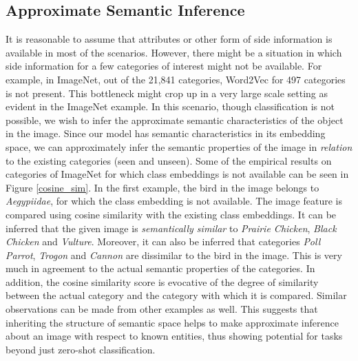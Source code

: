 \documentclass[10pt,twocolumn,letterpaper]{article}
\begin{document}
\subsection{Approximate Semantic Inference}
\label{approx_semantic_inference} 
It is reasonable to assume that attributes or other form of side information is available in most of the scenarios. However, there might be a situation in which side information for a few categories of interest might not be available. For example, in ImageNet, out of the 21,841 categories, Word2Vec for 497 categories is not present. This bottleneck might crop up in a very large scale setting as evident in the ImageNet example. In this scenario, though classification is not possible, we wish to infer the approximate semantic characteristics of the object in the image. Since our model has semantic characteristics in its embedding space, we can approximately infer the semantic properties of the image in \textit{relation} to the existing categories (seen and unseen). Some of the empirical results on categories of ImageNet for which class embeddings is not available can be seen in Figure \ref{cosine_sim}. 
In the first example, the bird in the image belongs to \textit{Aegypiidae}, for which the class embedding is not available. The image feature is compared using cosine similarity with the existing class embeddings. It can be inferred that the given image is \textit{semantically similar} to \textit{Prairie Chicken}, \textit{Black Chicken} and \textit{Vulture}. Moreover, it can also be inferred that categories \textit{Poll Parrot}, \textit{Trogon} and \textit{Cannon} are dissimilar to the bird in the  image. This is very much in agreement to the actual semantic properties of the categories. In addition, the cosine similarity score is evocative of the degree of similarity between the actual category and the category with which it is compared. Similar observations can be made from other examples as well. This suggests that inheriting the structure of semantic space helps to make approximate inference about  an image with respect to known entities, thus showing potential for tasks beyond just zero-shot classification.
\end{document}
